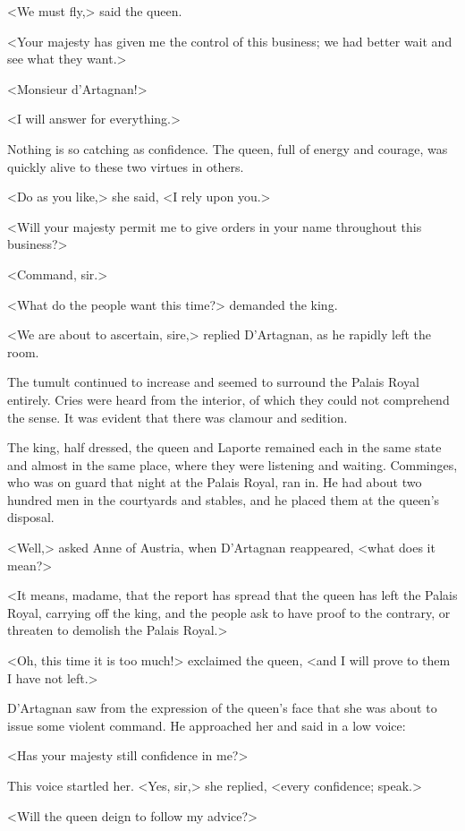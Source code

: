 <We must fly,> said the queen.

<Your majesty has given me the control of this business; we had better wait and see what they want.>

<Monsieur d'Artagnan!>

<I will answer for everything.>

Nothing is so catching as confidence. The queen, full of energy and courage, was quickly alive to these two virtues in others.

<Do as you like,> she said, <I rely upon you.>

<Will your majesty permit me to give orders in your name throughout this business?>

<Command, sir.>

<What do the people want this time?> demanded the king.

<We are about to ascertain, sire,> replied D'Artagnan, as he rapidly left the room.

The tumult continued to increase and seemed to surround the Palais Royal entirely. Cries were heard from the interior, of which they could not comprehend the sense. It was evident that there was clamour and sedition.

The king, half dressed, the queen and Laporte remained each in the same state and almost in the same place, where they were listening and waiting. Comminges, who was on guard that night at the Palais Royal, ran in. He had about two hundred men in the courtyards and stables, and he placed them at the queen's disposal.

<Well,> asked Anne of Austria, when D'Artagnan reappeared, <what does it mean?>

<It means, madame, that the report has spread that the queen has left the Palais Royal, carrying off the king, and the people ask to have proof to the contrary, or threaten to demolish the Palais Royal.>

<Oh, this time it is too much!> exclaimed the queen, <and I will prove to them I have not left.>

D'Artagnan saw from the expression of the queen's face that she was about to issue some violent command. He approached her and said in a low voice:

<Has your majesty still confidence in me?>

This voice startled her. <Yes, sir,> she replied, <every confidence; speak.>

<Will the queen deign to follow my advice?>

